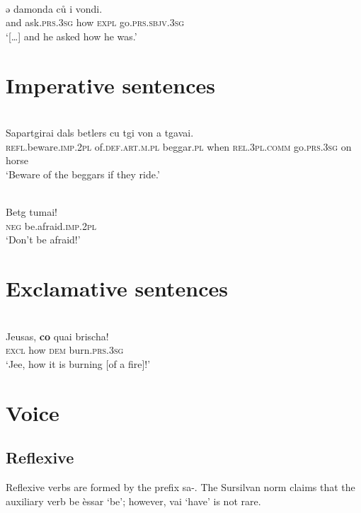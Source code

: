 \ea\label{ex:1:}
 {\citealt[105]{Büchli1966}}\\
\gll    ǝ damonda ců i vondi.\\
     and ask.\textsc{prs.3sg} how  \textsc{expl} go.\textsc{prs.sbjv.3sg}\\
\glt `[…] and he asked how he was.'
\z




\section{Imperative sentences}

\ea\label{}
\\
\gll  Sapartgirai dals betlers cu tgi von a tgavai.  \\
     \textsc{refl}.beware.\textsc{imp.2pl} of.\textsc{def.art.m.pl} beggar.\textsc{pl} when \textsc{rel.3pl.comm} go.\textsc{prs.3sg} on horse\\
\glt `Beware of the beggars if they ride.'
\z

\ea\label{}
\\
\gll  Betg tumai!\\
     \textsc{neg}  be.afraid.\textsc{imp.2pl}\\
\glt `Don’t be afraid!'
\z



\section{Exclamative sentences}

\ea\label{}
\\
\gll Jeusas, \textbf{co} quai brischa!   \\
   \textsc{excl} how \textsc{dem} burn.\textsc{prs.3sg}  \\
\glt `Jee, how it is burning [of a fire]!'
\z


\section{Voice}

\subsection{Reflexive}

Reflexive verbs are formed by the prefix sa-. The Sursilvan norm claims that the auxiliary verb be èssar `be'; however, vai `have' is not rare.

